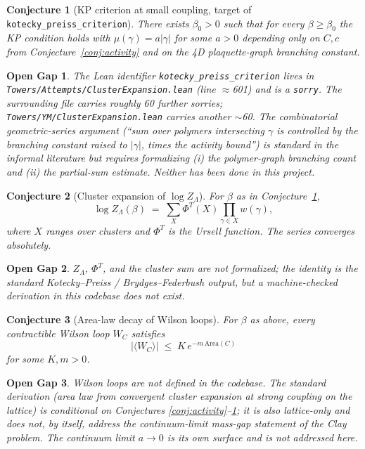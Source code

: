 \documentclass{article}
\newtheorem*{opengap}{Open Gap}
\newtheorem*{conjecture}{Conjecture}
\begin{document}
\begin{conjecture}[KP criterion at small coupling, target of
\texttt{kotecky\_preiss\_criterion}]
\label{conj:kp}
There exists $\beta_0>0$ such that for every $\beta\ge\beta_0$ the
KP condition holds with $\mu(\gamma) = a|\gamma|$ for some $a>0$
depending only on $C,c$ from Conjecture~\ref{conj:activity} and on
the 4D plaquette-graph branching constant.
\end{conjecture}

\begin{opengap}
The Lean identifier \texttt{kotecky\_preiss\_criterion} lives in
\texttt{Towers/Attempts/ClusterExpansion.lean} (line $\approx$601)
and is a \texttt{sorry}. The surrounding file carries roughly 60
further sorries; \texttt{Towers/YM/ClusterExpansion.lean} carries
another $\sim$60. The combinatorial geometric-series argument
(``sum over polymers intersecting $\gamma$ is controlled by the
branching constant raised to $|\gamma|$, times the activity bound'')
is standard in the informal literature but requires formalizing
(i) the polymer-graph branching count and (ii) the partial-sum
estimate. Neither has been done in this project.
\end{opengap}

\begin{conjecture}[Cluster expansion of $\log Z_\Lambda$]
For $\beta$ as in Conjecture~\ref{conj:kp},
\[
  \log Z_\Lambda(\beta) \;=\; \sum_X \Phi^T(X) \prod_{\gamma\in X} w(\gamma),
\]
where $X$ ranges over clusters and $\Phi^T$ is the Ursell function.
The series converges absolutely.
\end{conjecture}

\begin{opengap}
$Z_\Lambda$, $\Phi^T$, and the cluster sum are not formalized; the
identity is the standard Kotecky--Preiss / Brydges--Federbush
output, but a machine-checked derivation in this codebase does not
exist.
\end{opengap}

\begin{conjecture}[Area-law decay of Wilson loops]
For $\beta$ as above, every contractible Wilson loop $W_C$ satisfies
\[
  |\langle W_C\rangle| \;\le\; K\, e^{-m\,\mathrm{Area}(C)}
\]
for some $K,m>0$.
\end{conjecture}

\begin{opengap}
Wilson loops are not defined in the codebase. The standard derivation
(area law from convergent cluster expansion at strong coupling on
the lattice) is conditional on Conjectures
\ref{conj:activity}--\ref{conj:kp}; it is also \emph{lattice-only}
and does not, by itself, address the continuum-limit mass-gap
statement of the Clay problem. The continuum limit
$a\to 0$ is its own surface and is not addressed here.
\end{opengap}
\end{document}
